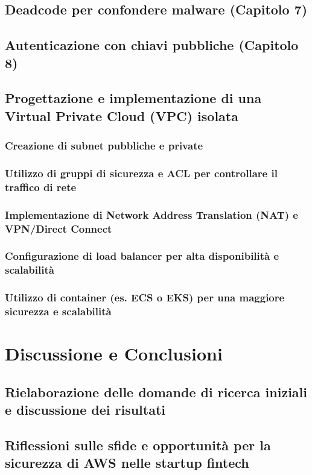 \documentclass[a4paper,12pt]{report}
\begin{document}
\section{Deadcode per confondere malware (Capitolo 7)}
\section{Autenticazione con chiavi pubbliche (Capitolo 8)}
\section{Progettazione e implementazione di una Virtual Private Cloud (VPC) isolata}
\subsection{Creazione di subnet pubbliche e private}
\subsection{Utilizzo di gruppi di sicurezza e ACL per controllare il traffico di rete}
\subsection{Implementazione di Network Address Translation (NAT) e VPN/Direct Connect}
\subsection{Configurazione di load balancer per alta disponibilità e scalabilità}
\subsection{Utilizzo di container (es. ECS o EKS) per una maggiore sicurezza e scalabilità}

\chapter{Discussione e Conclusioni}
\section{Rielaborazione delle domande di ricerca iniziali e discussione dei risultati}
\section{Riflessioni sulle sfide e opportunità per la sicurezza di AWS nelle startup fintech}
\end{document}
